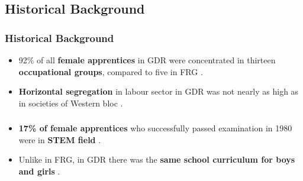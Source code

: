 \documentclass[11pt, aspectratio=1610, xcolor={dvipsnames}]{beamer}
\newcommand{\highlight}[1]{\textbf{\textcolor{PineGreen}{#1}}}
\newcommand{\todo}[1]{\textbf{\textcolor{red}{#1}}}
\begin{document}
	\subsection{Historical Background}
	\begin{frame}
		\frametitle{Historical Background}
		
		\begin{itemize}
			\item 92\% of all \highlight{female apprentices} in GDR were concentrated in thirteen \highlight{occupational groups}, compared to five in FRG \textcolor{darkgray}{\citep{Menschik1974}}.
			\item \highlight{Horizontal segregation} in labour sector in GDR was not nearly as high as in societies of Western bloc \textcolor{darkgray}{\citep{Lane1983}}.
		\end{itemize}
		
	\end{frame}
	
	\begin{frame}
		\frametitle{}
		
		\begin{itemize}
			\item \highlight{17\% of female apprentices} who successfully passed examination in 1980 were in \highlight{STEM field} \textcolor{darkgray}{\citep[p. 293]{DDRJahrbuch1981}}.
			\item Unlike in FRG, in GDR there was the \highlight{same school curriculum for boys and girls} \textcolor{darkgray}{\citep{FuchsSchuendeln2016, Lippmann2018}}.
		\end{itemize}
		
	\end{frame}
	

	
\end{document}
